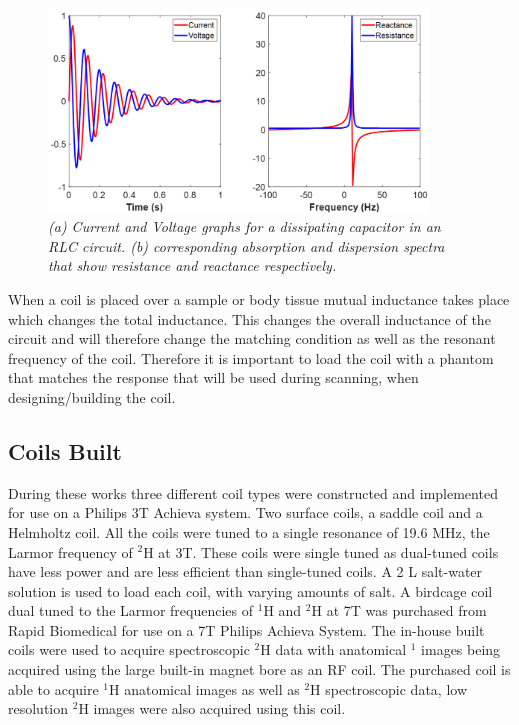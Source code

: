 \documentclass[class=article, crop=false]{standalone}
\begin{document}
\begin{figure}
    \centering
    \includegraphics[width=0.9\textwidth]{Figures/Theory/VI.png}
    \caption{\textit{(a) Current and Voltage graphs for a dissipating capacitor in an RLC circuit. (b) corresponding absorption and dispersion spectra that show resistance and reactance respectively.}}
    \label{fig:theory:VI}
\end{figure}

When a coil is placed over a sample or body tissue mutual inductance takes place which changes the total inductance. This changes the overall inductance of the circuit and will therefore change the matching condition as well as the resonant frequency of the coil. Therefore it is important to load the coil with a phantom that matches the response that will be used during scanning, when designing/building the coil. 

\subsection{Coils Built}

During these works three different coil types were constructed and implemented for use on a Philips 3T Achieva system. Two surface coils, a saddle coil and a Helmholtz coil. All the coils were tuned to a single resonance of 19.6 MHz, the Larmor frequency of $^2$H at 3T. These coils were single tuned as dual-tuned coils have less power and are less efficient than single-tuned coils. A 2 L salt-water solution is used to load each coil, with varying amounts of salt. A birdcage coil dual tuned to the Larmor frequencies of $^1$H and $^2$H at 7T was purchased from Rapid Biomedical for use on a 7T Philips Achieva System. The in-house built coils were used to acquire spectroscopic $^2$H data with anatomical $^1$ images being acquired using the large built-in magnet bore as an RF coil. The purchased coil is able to acquire $^1$H anatomical images as well as $^2$H spectroscopic data, low resolution $^2$H images were also acquired using this coil.
\end{document}
